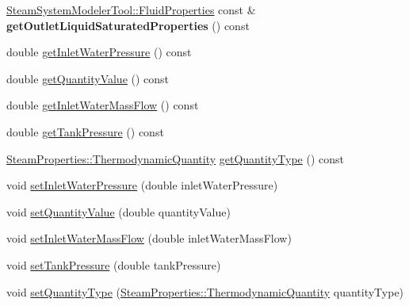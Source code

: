 \begin{DoxyCompactItemize}
\mbox{\label{class_flash_tank_af65a272b08ca55e4e97b3a00c952a6e7}} 
\hyperlink{struct_steam_system_modeler_tool_1_1_fluid_properties}{Steam\+System\+Modeler\+Tool\+::\+Fluid\+Properties} const  \& {\bfseries get\+Outlet\+Liquid\+Saturated\+Properties} () const
\item 
double \hyperlink{class_flash_tank_a62e8ff97d91da0845526c494022e41da}{get\+Inlet\+Water\+Pressure} () const
\item 
double \hyperlink{class_flash_tank_ab2145598969881df58736a1b65326d17}{get\+Quantity\+Value} () const
\item 
double \hyperlink{class_flash_tank_a2b6dcd9e175a9f2fc550ea91006aa66a}{get\+Inlet\+Water\+Mass\+Flow} () const
\item 
double \hyperlink{class_flash_tank_af5d4f0bf7babe61120e1e4452594e1af}{get\+Tank\+Pressure} () const
\item 
\hyperlink{class_steam_properties_ae0294bedf7d178c2d8fb6aed0f62fbff}{Steam\+Properties\+::\+Thermodynamic\+Quantity} \hyperlink{class_flash_tank_a1800317a9b9dd8ff8fb18c693e846a45}{get\+Quantity\+Type} () const
\item 
void \hyperlink{class_flash_tank_aed0991a7902401d110fb2f4b472326f5}{set\+Inlet\+Water\+Pressure} (double inlet\+Water\+Pressure)
\item 
void \hyperlink{class_flash_tank_ac7392743aeaf8de6ce368814ea42e236}{set\+Quantity\+Value} (double quantity\+Value)
\item 
void \hyperlink{class_flash_tank_a2bcbd92d39ef3c760bdd65066ba3d34a}{set\+Inlet\+Water\+Mass\+Flow} (double inlet\+Water\+Mass\+Flow)
\item 
void \hyperlink{class_flash_tank_a8b3bb51a62dac4f76284dfdc114d83fe}{set\+Tank\+Pressure} (double tank\+Pressure)
\item 
void \hyperlink{class_flash_tank_a30aa7a42d1547f61b176da4a15e8e8ee}{set\+Quantity\+Type} (\hyperlink{class_steam_properties_ae0294bedf7d178c2d8fb6aed0f62fbff}{Steam\+Properties\+::\+Thermodynamic\+Quantity} quantity\+Type)
\end{DoxyCompactItemize}
